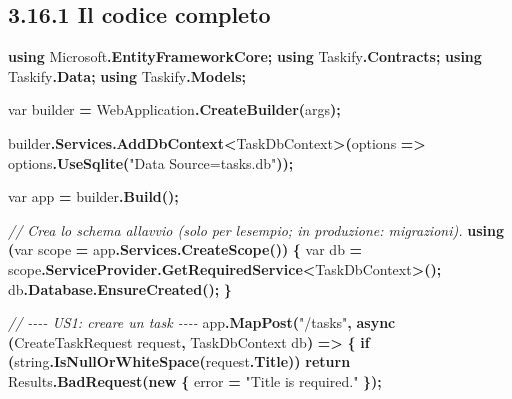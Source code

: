 \documentclass[
  italian,
  10pt,
]{book}
\newenvironment{Shaded}{\begin{snugshade}}{\end{snugshade}}
\newcommand{\CommentTok}[1]{\textcolor[rgb]{0.56,0.35,0.01}{\textit{#1}}}
\newcommand{\DataTypeTok}[1]{\textcolor[rgb]{0.13,0.29,0.53}{#1}}
\newcommand{\FunctionTok}[1]{\textcolor[rgb]{0.13,0.29,0.53}{\textbf{#1}}}
\newcommand{\KeywordTok}[1]{\textcolor[rgb]{0.13,0.29,0.53}{\textbf{#1}}}
\newcommand{\NormalTok}[1]{#1}
\newcommand{\OperatorTok}[1]{\textcolor[rgb]{0.81,0.36,0.00}{\textbf{#1}}}
\newcommand{\StringTok}[1]{\textcolor[rgb]{0.31,0.60,0.02}{#1}}
\begin{document}
\subsection{3.16.1 Il codice completo}\label{il-codice-completo}

\begin{Shaded}
\begin{Highlighting}[]
\KeywordTok{using}\NormalTok{ Microsoft}\OperatorTok{.}\FunctionTok{EntityFrameworkCore}\OperatorTok{;}
\KeywordTok{using}\NormalTok{ Taskify}\OperatorTok{.}\FunctionTok{Contracts}\OperatorTok{;}
\KeywordTok{using}\NormalTok{ Taskify}\OperatorTok{.}\FunctionTok{Data}\OperatorTok{;}
\KeywordTok{using}\NormalTok{ Taskify}\OperatorTok{.}\FunctionTok{Models}\OperatorTok{;}

\DataTypeTok{var}\NormalTok{ builder }\OperatorTok{=}\NormalTok{ WebApplication}\OperatorTok{.}\FunctionTok{CreateBuilder}\OperatorTok{(}\NormalTok{args}\OperatorTok{);}

\NormalTok{builder}\OperatorTok{.}\FunctionTok{Services}\OperatorTok{.}\FunctionTok{AddDbContext}\OperatorTok{\textless{}}\NormalTok{TaskDbContext}\OperatorTok{\textgreater{}(}\NormalTok{options }\OperatorTok{=\textgreater{}}
\NormalTok{    options}\OperatorTok{.}\FunctionTok{UseSqlite}\OperatorTok{(}\StringTok{"Data Source=tasks.db"}\OperatorTok{));}

\DataTypeTok{var}\NormalTok{ app }\OperatorTok{=}\NormalTok{ builder}\OperatorTok{.}\FunctionTok{Build}\OperatorTok{();}

\CommentTok{// Crea lo schema all\textquotesingle{}avvio (solo per l\textquotesingle{}esempio; in produzione: migrazioni).}
\KeywordTok{using} \OperatorTok{(}\DataTypeTok{var}\NormalTok{ scope }\OperatorTok{=}\NormalTok{ app}\OperatorTok{.}\FunctionTok{Services}\OperatorTok{.}\FunctionTok{CreateScope}\OperatorTok{())}
\OperatorTok{\{}
    \DataTypeTok{var}\NormalTok{ db }\OperatorTok{=}\NormalTok{ scope}\OperatorTok{.}\FunctionTok{ServiceProvider}\OperatorTok{.}\FunctionTok{GetRequiredService}\OperatorTok{\textless{}}\NormalTok{TaskDbContext}\OperatorTok{\textgreater{}();}
\NormalTok{    db}\OperatorTok{.}\FunctionTok{Database}\OperatorTok{.}\FunctionTok{EnsureCreated}\OperatorTok{();}
\OperatorTok{\}}

\CommentTok{// {-}{-}{-}{-} US1: creare un task {-}{-}{-}{-}}
\NormalTok{app}\OperatorTok{.}\FunctionTok{MapPost}\OperatorTok{(}\StringTok{"/tasks"}\OperatorTok{,} \FunctionTok{async} \OperatorTok{(}\NormalTok{CreateTaskRequest request}\OperatorTok{,}\NormalTok{ TaskDbContext db}\OperatorTok{)} \OperatorTok{=\textgreater{}}
\OperatorTok{\{}
    \KeywordTok{if} \OperatorTok{(}\DataTypeTok{string}\OperatorTok{.}\FunctionTok{IsNullOrWhiteSpace}\OperatorTok{(}\NormalTok{request}\OperatorTok{.}\FunctionTok{Title}\OperatorTok{))}
        \KeywordTok{return}\NormalTok{ Results}\OperatorTok{.}\FunctionTok{BadRequest}\OperatorTok{(}\KeywordTok{new} \OperatorTok{\{}\NormalTok{ error }\OperatorTok{=} \StringTok{"Title is required."} \OperatorTok{\});}


\end{Highlighting}
\end{Shaded}
\end{document}
